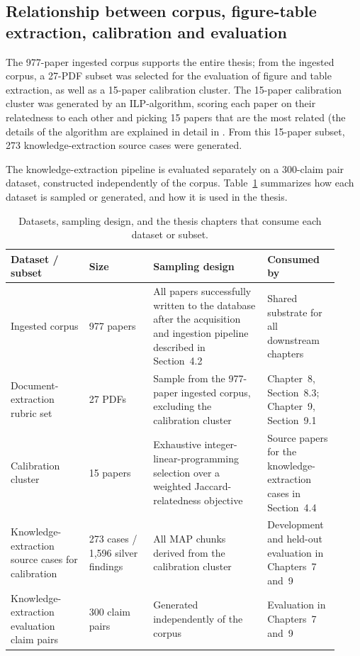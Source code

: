 \subsection{Relationship between corpus, figure-table extraction, calibration and evaluation}

The 977-paper ingested corpus supports the entire thesis; from the ingested corpus, a 27-PDF subset was selected for the evaluation of figure and table extraction, as well as a 15-paper calibration cluster. The 15-paper calibration cluster was generated by an ILP-algorithm, scoring each paper on their relatedness to each other and picking 15 papers that are the most related (the details of the algorithm are explained in detail in . From this 15-paper subset, 273 knowledge-extraction source cases were generated. 

The knowledge-extraction pipeline is evaluated separately on a 300-claim pair dataset, constructed independently of the corpus. Table~\ref{tab:dataset-purpose-mapping} summarizes how each dataset is sampled or generated, and how it is used in the thesis. 


\begin{table}[htpb]
  \caption[Dataset-purpose mapping]{Datasets, sampling design, and the thesis chapters that consume each dataset or subset.}
  \label{tab:dataset-purpose-mapping}
  \centering
  \begin{tabular}{p{0.22\linewidth} p{0.18\linewidth} p{0.32\linewidth} p{0.20\linewidth}}
    \toprule
      Dataset / subset & Size & Sampling design & Consumed by \\
    \midrule
      Ingested corpus
      & 977 papers
      & All papers successfully written to the database after the acquisition and ingestion pipeline described in Section~4.2
      & Shared substrate for all downstream chapters \\

      Document-extraction rubric set
      & 27 PDFs
      & Sample from the 977-paper ingested corpus, excluding the calibration cluster
      & Chapter~8, Section~8.3; Chapter~9, Section~9.1 \\

      Calibration cluster
      & 15 papers
      & Exhaustive integer-linear-programming selection over a weighted Jaccard-relatedness objective
      & Source papers for the knowledge-extraction cases in Section~4.4 \\

      Knowledge-extraction source cases for calibration
      & 273 cases / 1,596 silver findings
      & All MAP chunks derived from the calibration cluster
      & Development and held-out evaluation in Chapters~7 and~9 \\

        Knowledge-extraction evaluation claim pairs
      & 300 claim pairs
      & Generated independently of the corpus
      & Evaluation in Chapters~7 and~9 \\      

    \bottomrule
  \end{tabular}
\end{table}

